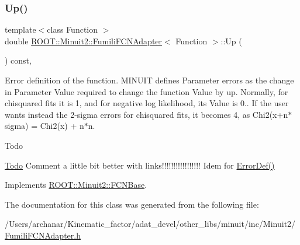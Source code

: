 \subsubsection{\texorpdfstring{Up()}{Up()}\hspace{0.1cm}{\footnotesize\ttfamily [2/2]}}
{\footnotesize\ttfamily template$<$class Function $>$ \\
double \mbox{\hyperlink{classROOT_1_1Minuit2_1_1FumiliFCNAdapter}{R\+O\+O\+T\+::\+Minuit2\+::\+Fumili\+F\+C\+N\+Adapter}}$<$ Function $>$\+::Up (\begin{DoxyParamCaption}{ }\end{DoxyParamCaption}) const\hspace{0.3cm}{\ttfamily [inline]}, {\ttfamily [virtual]}}

Error definition of the function. M\+I\+N\+U\+IT defines Parameter errors as the change in Parameter Value required to change the function Value by up. Normally, for chisquared fits it is 1, and for negative log likelihood, its Value is 0.. If the user wants instead the 2-\/sigma errors for chisquared fits, it becomes 4, as Chi2(x+n$\ast$sigma) = Chi2(x) + n$\ast$n.

\begin{DoxyRefDesc}{Todo}
\item[\mbox{\hyperlink{todo__todo000001}{Todo}}]Comment a little bit better with links!!!!!!!!!!!!!!!!! Idem for \mbox{\hyperlink{classROOT_1_1Minuit2_1_1FCNBase_ac4592475c58a65b037ba97ab5f3cba10}{Error\+Def()}}\end{DoxyRefDesc}


Implements \mbox{\hyperlink{classROOT_1_1Minuit2_1_1FCNBase_a04ef08ddad92ce8d89d498efbe021c39}{R\+O\+O\+T\+::\+Minuit2\+::\+F\+C\+N\+Base}}.



The documentation for this class was generated from the following file\+:\begin{DoxyCompactItemize}
\item 
/\+Users/archanar/\+Kinematic\+\_\+factor/adat\+\_\+devel/other\+\_\+libs/minuit/inc/\+Minuit2/\mbox{\hyperlink{other__libs_2minuit_2inc_2Minuit2_2FumiliFCNAdapter_8h}{Fumili\+F\+C\+N\+Adapter.\+h}}\end{DoxyCompactItemize}
